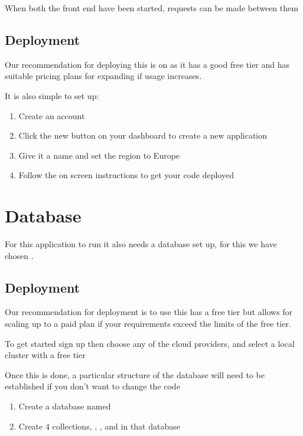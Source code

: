 \documentclass[letterpaper,10pt,english]{sphinxmanual}
\let\oldsubsection\subsection
\renewcommand{\subsection}{\needspace{6\baselineskip}\oldsubsection}
\begin{document}
When both the front end have been started, requests can be made between
them


\subsection{Deployment}
\label{\detokenize{docs/Installation/backEnd:deployment}}
Our recommendation for deploying this is on
 as it has a good free tier and has
suitable pricing plans for expanding if usage increases.

It is also simple to set up:
\begin{enumerate}
%
\item {} 
Create an account 

\item {} 
Click the new button on your dashboard to create a new application

\item {} 
Give it a name and set the region to Europe

\item {} 
Follow the on screen instructions to get your code deployed

\end{enumerate}


\section{Database}
\label{\detokenize{docs/Installation/database:database}}\label{\detokenize{docs/Installation/database::doc}}
For this application to run it also needs a database set up, for this we
have chosen .


\subsection{Deployment}
\label{\detokenize{docs/Installation/database:deployment}}
Our recommendation for deployment is to use  this has a free tier but
allows for scaling up to a paid plan if your requirements exceed the
limits of the free tier.

To get started sign up 
then choose any of the cloud providers, and select a local cluster with
a free tier

Once this is done, a particular structure of the database will need to
be established if you don’t want to change the code
\begin{enumerate}
%
\item {} 
Create a database named 

\item {} 
Create 4 collections, , ,  and  in
that database

\end{enumerate}
\end{document}
